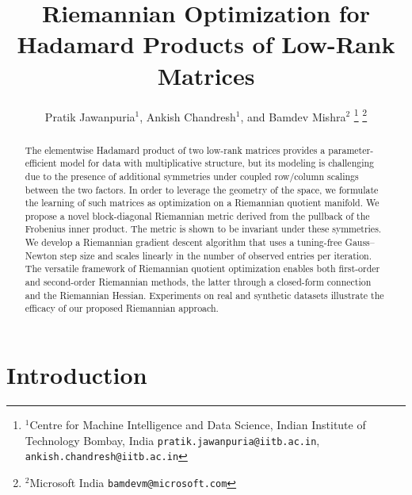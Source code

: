 \documentclass[letterpaper, 10 pt, conference]{ieeeconf}
\title{\LARGE \bf Riemannian Optimization for\\Hadamard Products of Low-Rank Matrices}
\author{Pratik Jawanpuria$^{1}$, Ankish Chandresh$^{1}$, and Bamdev Mishra$^{2}$%
\thanks{$^{1}$Centre for Machine Intelligence and Data Science, Indian Institute of Technology Bombay, India {\tt\small pratik.jawanpuria@iitb.ac.in}, {\tt\small ankish.chandresh@iitb.ac.in}}%
\thanks{$^{2}$Microsoft India {\tt\small bamdevm@microsoft.com}}%
}
\theoremstyle{plain}
\theoremstyle{definition}
\theoremstyle{remark}
\begin{document}
\maketitle
\thispagestyle{empty}
\pagestyle{empty}


\begin{abstract}
The elementwise Hadamard product of two low-rank matrices provides a parameter-efficient model for data with multiplicative structure, but its modeling is challenging due to the presence of additional symmetries under coupled row/column scalings between the two factors. In order to leverage the geometry of the space, we formulate the learning of such matrices as optimization on a Riemannian quotient manifold. We propose a novel block-diagonal Riemannian metric derived from the pullback of the Frobenius inner product. The metric is shown to be invariant under these symmetries. We develop a Riemannian gradient descent algorithm that uses a tuning-free Gauss--Newton step size and scales linearly in the number of observed entries per iteration. The versatile framework of Riemannian quotient optimization enables both first-order and second-order Riemannian methods, the latter through a closed-form connection and the Riemannian Hessian. Experiments on real and synthetic datasets illustrate the efficacy of our proposed Riemannian approach.


\end{abstract}

\section{Introduction}
\label{sec:intro}
\end{document}

